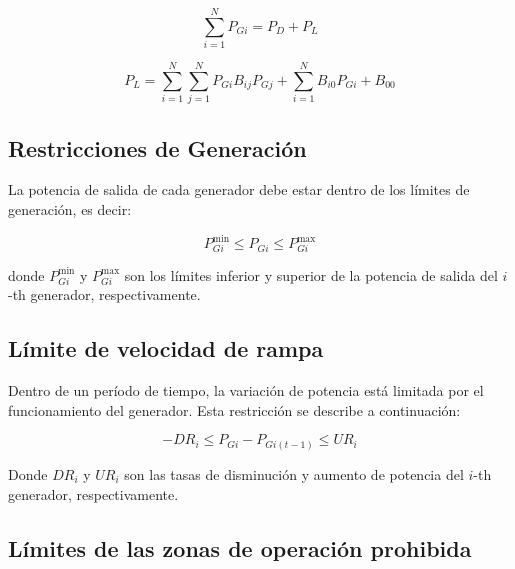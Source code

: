 \documentclass[11pt]{article}
\begin{document}
\begin{equation}
    \sum_{i=1}^{N} P_{Gi} = P_{D} + P_{L}
\end{equation}

\begin{equation}
    P_{L} = \sum_{i=1}^{N}\sum_{j=1}^{N} P_{Gi}B_{ij}P_{Gj} + \sum_{i=1}^{N}B_{i0}P_{Gi} + B_{00}
\end{equation}

\subsection{Restricciones de Generación}

La potencia de salida de cada generador debe estar dentro de los límites de generación, es decir:

\begin{equation}
    P_{Gi}^{\min} \leq P_{Gi} \leq P_{Gi}^{\max}
\end{equation}

donde \( P_{Gi}^{\min} \) y \( P_{Gi}^{\max} \) son los límites inferior y superior de la potencia de salida del 
\( i \)-th generador, respectivamente.

\subsection{Límite de velocidad de rampa}


Dentro de un período de tiempo, la variación de potencia está limitada por el funcionamiento del generador. 
Esta restricción se describe a continuación:

\begin{equation}
    - DR_{i} \leq  P_{Gi} - P_{Gi(t-1)} \leq UR_{i}
\end{equation}

Donde \( DR_{i} \) y \( UR_{i} \) son las tasas de disminución y aumento de potencia del \( i \)-th generador,
respectivamente.

\subsection{Límites de las zonas de operación prohibida}
\end{document}
